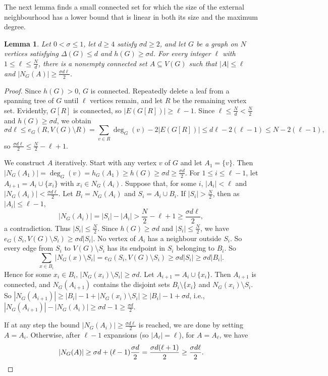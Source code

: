 \documentclass[11pt,a4paper]{article}
\newtheorem{lemma}[theorem]{Lemma}
\theoremstyle{definition}
\theoremstyle{remark}
\begin{document}
The next lemma finds a small  connected set for which the size of the external neighbourhood has a lower bound that is linear in both its size and the maximum degree.

\begin{lemma}\label{lem:large-neighbourhood}
Let $0<\sigma\le1$, let $d\ge4$ satisfy $\sigma d\ge2$, and let $G$
be a graph on $N$ vertices satisfying $\Delta(G)\le d$ and
$h(G)\ge\sigma d$. For every integer $\ell$ with
$1\le\ell\le\frac{N}{d}$, there is a nonempty connected set
$A\subseteq V(G)$ such that $|A|\le\ell$ and
$|N_G(A)|\ge\frac{\sigma d\ell}{2}$.
\end{lemma}

\begin{proof}
Since $h(G)>0$,  $G$ is connected. Repeatedly delete a leaf
from a spanning tree of $G$ until $\ell$ vertices remain, and let $R$
be the remaining vertex set. Evidently, $G[R]$ is connected, so 
$|E(G[R])|\ge \ell-1$.
Since  $\ell\le\frac{N}{d}<\frac{N}{2}$ and $h(G)\ge\sigma d$, we obtain
\[
 \sigma d\ell
 \le e_G(R,V(G)\setminus R)=\sum_{v\in R}\deg_G(v)-2|E(G[R])|
 \le d\ell-2(\ell-1)\le N-2(\ell-1), 
\]
so
$\frac{\sigma d\ell}{2}\le\frac{N}{2}-\ell+1$.

We construct $A$ iteratively. Start with any vertex $v$ of $G$ and let $A_1=\{v\}$. Then  $|N_G(A_1)|=\deg_G(v)=h_G(A_1)\ge h(G)\ge\sigma d \ge\frac{\sigma d}{2}$. For $1\le i\le \ell-1$, let $A_{i+1}=A_i\cup \{x_i\}$ with $x_i\in N_G(A_i)$.  
Suppose that, for some $i$,
$|A_i|<\ell$ and $|N_G(A_i)|<\frac{\sigma d\ell}{2}$.  Let
$B_i=N_G(A_i)$ and $S_i=A_i\cup B_i$.  If $|S_i|>\frac{N}{2}$, then
as $|A_i|\le\ell-1$, 
\[
 |N_G(A_i)|=|S_i|-|A_i|>\frac{N}{2}-\ell+1
 \ge\frac{\sigma d\ell}{2},
\]
a contradiction. Thus $|S_i|\le \frac{N}{2}$. 
Since $h(G)\ge \sigma d$ and $|S_i|\le \frac{N}{2}$, we have 
$e_G(S_i,V(G)\setminus S_i)\ge \sigma d |S_i|$.
No vertex of $A_i$ has a neighbour outside $S_i$. So every edge from $S_i$
to $V(G)\setminus S_i$  has its endpoint in $S_i$ belonging to
$B_i$. So
\[
 \sum_{x\in B_i}|N_G(x)\setminus S_i|
 =e_G(S_i,V(G)\setminus S_i)
 \ge\sigma d|S_i|\ge\sigma d|B_i|.
\]
Hence for some $x_i\in B_i$,  $|N_G(x_i)\setminus S_i|\ge \sigma d$. 
Let  $A_{i+1}=A_i\cup\{x_i\}$. Then $A_{i+1}$  is connected, and 
$N_G(A_{i+1})$ 
contains the disjoint sets $B_i\setminus\{x_i\}$ and
$N_G(x_i)\setminus S_i$. So
$|N_G(A_{i+1})|\ge |B_i|-1+|N_G(x_i)\setminus S_i|\ge |B_i|-1+\sigma d$, i.e., $|N_G(A_{i+1})|-|N_G(A_i)|\ge \sigma d-1\ge \frac{\sigma d}{2}$. 

If at any step the bound $|N_G(A_i)|\ge \frac{\sigma d\ell}{2}$ is reached, we are done by setting $A=A_i$. Otherwise, after $\ell-1$ expansions (so $|A_\ell|=\ell$), for $A=A_{\ell}$, we have 
\[
|N_G(A)|
\ge \sigma d + (\ell-1)\frac{\sigma d}{2}
= \frac{\sigma d(\ell+1)}{2}
\ge \frac{\sigma d\ell}{2}. \qedhere
\]
\end{proof}
\end{document}
